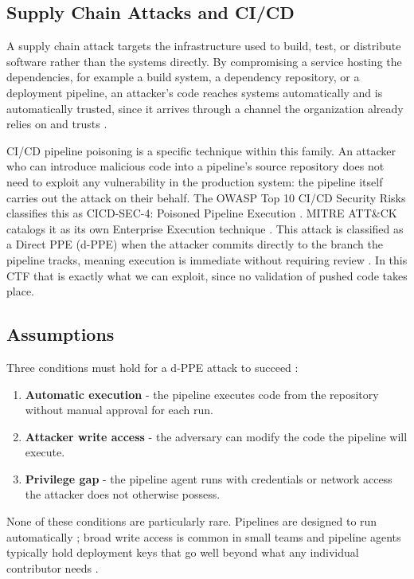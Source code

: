 \documentclass{article}
\begin{document}
\subsection{Supply Chain Attacks and CI/CD}

A supply chain attack targets the infrastructure used to build, test, or distribute software rather than the systems directly. By compromising a service hosting the dependencies, for example a build system, a dependency repository, or a deployment pipeline, an attacker's code reaches systems automatically and is automatically trusted, since it arrives through a channel the organization already relies on and trusts \cite{owaspPPE}.

CI/CD pipeline poisoning is a specific technique within this family. An attacker who can introduce malicious code into a pipeline's source repository does not need to exploit any vulnerability in the production system: the pipeline itself carries out the attack on their behalf. The OWASP Top 10 CI/CD Security Risks classifies this as CICD-SEC-4: Poisoned Pipeline Execution \cite{owaspPPE}. MITRE ATT\&CK catalogs it as its own Enterprise Execution technique \cite{mitrePoisonedPipeline}. This attack is classified as a Direct PPE (d-PPE) when the attacker commits directly to the branch the pipeline tracks, meaning execution is immediate without requiring review  \cite{bishopFoxPPE}. In this CTF that is exactly what we can exploit, since no validation of pushed code takes place.

\subsection{Assumptions}

Three conditions must hold for a d-PPE attack to succeed \cite{bishopFoxPPE}:

\begin{enumerate}
    \item \textbf{Automatic execution} - the pipeline executes code from the repository without manual approval for each run.
    \item \textbf{Attacker write access} - the adversary can modify the code the pipeline will execute.
    \item \textbf{Privilege gap} - the pipeline agent runs with credentials or network access the attacker does not otherwise possess.
\end{enumerate}

None of these conditions are particularly rare. Pipelines are designed to run automatically \cite{fowlerCI}; broad write access is common in small teams and pipeline agents typically hold deployment keys that go well beyond what any individual contributor needs \cite{owaspPPE}.
\end{document}
